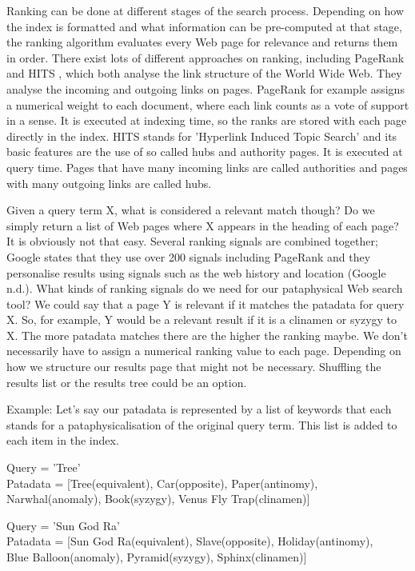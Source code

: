 Ranking can be done at different stages of the search process. Depending on how the index is formatted and what information can be pre-computed at that stage, the ranking algorithm evaluates every Web page for relevance and returns them in order. There exist lots of different approaches on ranking, including PageRank \citep{Brin1998} and HITS \citep{Kleinberg1999}, which both analyse the link structure of the World Wide Web. They analyse the incoming and outgoing links on pages. PageRank for example assigns a numerical weight to each document, where each link counts as a vote of support in a sense. It is executed at indexing time, so the ranks are stored with each page directly in the index. HITS stands for 'Hyperlink Induced Topic Search' and its basic features are the use of so called hubs and authority pages. It is executed at query time. Pages that have many incoming links are called authorities and pages with many outgoing links are called hubs.

Given a query term X, what is considered a relevant match though? Do we simply return a list of Web pages where X appears in the heading of each page? It is obviously not that easy. Several ranking signals are combined together; Google states that they use over 200 signals including PageRank and they personalise results using signals such as the web history and location (Google n.d.).
What kinds of ranking signals do we need for our pataphysical Web search tool? We could say that a page Y is relevant if it matches the patadata for query X. So, for example, Y would be a relevant result if it is a clinamen or syzygy to X. The more patadata matches there are the higher the ranking maybe. We don't necessarily have to assign a numerical ranking value to each page. Depending on how we structure our results page that might not be necessary. Shuffling the results list or the results tree could be an option.

Example: Let's say our patadata is represented by a list of keywords that each stands for a pataphysicalisation of the original query term. This list is added to each item in the index.

Query      = 'Tree'\\
Patadata = [Tree(equivalent),  Car(opposite), Paper(antinomy),\\ Narwhal(anomaly), Book(syzygy), Venus Fly Trap(clinamen)]

Query      = 'Sun God Ra'\\
Patadata = [Sun God Ra(equivalent),  Slave(opposite), Holiday(antinomy),\\ Blue Balloon(anomaly), Pyramid(syzygy), Sphinx(clinamen)]

